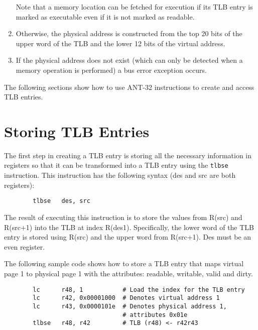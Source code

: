 \begin{enumerate}
                Note that a memory location can be fetched for
                execution if its TLB entry is marked as executable
                even if it is not marked as readable.

        \item Otherwise, the physical address is constructed from the
                top 20 bits of the upper word of the TLB and the lower
                12 bits of the virtual address.

        \item If the physical address does not exist (which can only
                be detected when a memory operation is performed) a
                bus error exception occurs.

\end{enumerate}

The following sections show how to use ANT-32 instructions to create
and access TLB entries.

\section{Storing TLB Entries}

The first step in creating a TLB entry is storing all the 
necessary information in registers so that it can be transformed 
into a TLB entry using the {\tt tlbse} instruction. This instruction 
has the following syntax (des and src are both registers):

\begin{verbatim}
        tlbse 	des, src 
\end{verbatim}

The result of executing this instruction is to store the values 
from R(src) and R(src+1) into the TLB at index R(des1). 
Specifically, the lower word of the TLB entry is stored using 
R(src) and the upper word from R(src+1). Des must be an even register.

The following sample code shows how to store a TLB entry that
maps virtual page 1 to physical page 1 with the attributes:
readable, writable, valid and dirty.

{\small
\begin{verbatim}
        lc      r48, 1           # Load the index for the TLB entry
        lc      r42, 0x00001000  # Denotes virtual address 1 
        lc      r43, 0x0000101e  # Denotes physical address 1, 
                                 # attributes 0x01e 
        tlbse   r48, r42         # TLB (r48) <- r42r43
\end{verbatim}}

